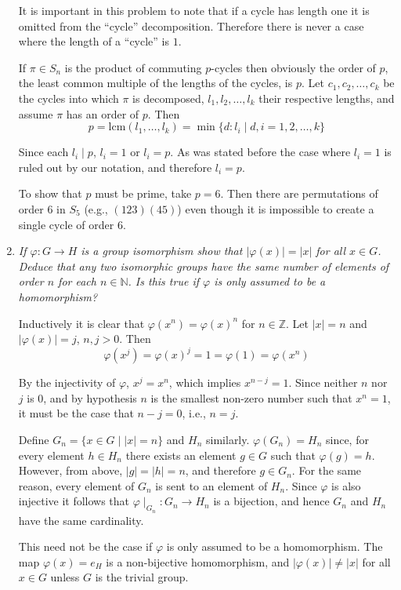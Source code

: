 \documentclass[letterpaper, 11pt]{article}
\begin{document}
\begin{enumerate}
It is important in this problem to note that if a cycle has length one it is omitted from the ``cycle'' decomposition.  Therefore there is never a case where the length of a ``cycle'' is $1$.

If $\pi \in S_n$ is the product of commuting $p$-cycles then obviously the order of $p$, the least common multiple of the lengths of the cycles, is $p$.  Let $c_1, c_2, \ldots, c_k$ be the cycles into which $\pi$ is decomposed, $l_1, l_2, \ldots, l_k$ their respective lengths, and assume $\pi$ has an order of $p$.  Then
\[
p = \mbox{lcm}(l_1, \ldots, l_k) = \min\{d : l_i \mid d, i=1,2,\ldots,k\}
\]

Since each $l_i \mid p$, $l_i = 1$ or $l_i = p$. As was stated before the case where $l_i = 1$ is ruled out by our notation, and therefore $l_i = p$.

To show that $p$ must be prime, take $p=6$.  Then there are permutations of order $6$ in $S_5$ (e.g., $(123)(45)$) even though it is impossible to create a single cycle of order $6$.

\item \emph{If $\varphi: G \rightarrow H$ is a group isomorphism show that $|\varphi(x)|=|x|$ for all $x \in G$.  Deduce that any two isomorphic groups have the same number of elements of order $n$ for each $n \in \mathbb{N}$.  Is this true if $\varphi$ is only assumed to be a homomorphism?}

Inductively it is clear that $\varphi(x^n) = \varphi(x)^n$ for $n \in \mathbb{Z}$.  Let $|x|=n$ and $|\varphi(x)|=j$, $n,j > 0$.  Then
\[
\varphi(x^j) = \varphi(x)^j = 1 = \varphi(1) = \varphi(x^n)
\]

By the injectivity of $\varphi$, $x^j = x^n$, which implies $x^{n-j} = 1$.  Since neither $n$ nor $j$ is $0$, and by hypothesis $n$ is the smallest non-zero number such that $x^n = 1$, it must be the case that $n-j=0$, i.e., $n=j$.

Define $G_n = \{x \in G \mid |x| = n\}$ and $H_n$ similarly.  $\varphi(G_n) = H_n$ since, for every element $h \in H_n$ there exists an element $g \in G$ such that $\varphi(g) = h$.  However, from above, $|g| = |h| = n$, and therefore $g \in G_n$.  For the same reason, every element of $G_n$ is sent to an element of $H_n$.  Since $\varphi$ is also injective it follows that $\varphi\mid_{G_n}: G_n \rightarrow H_n$ is a bijection, and hence $G_n$ and $H_n$ have the same cardinality.

This need not be the case if $\varphi$ is only assumed to be a homomorphism.  The map $\varphi(x) = e_H$ is a non-bijective homomorphism, and $|\varphi(x)| \neq |x|$ for all $x \in G$ unless $G$ is the trivial group.


\end{enumerate}
\end{document}
